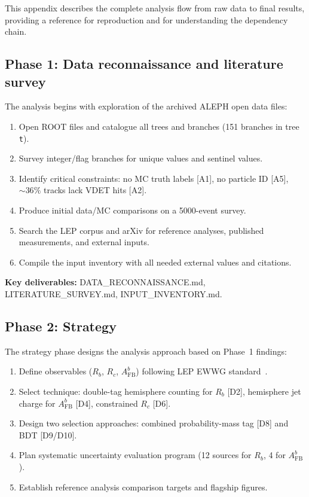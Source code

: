 \documentclass[11pt,a4paper]{article}
\begin{document}
This appendix describes the complete analysis flow from raw data to final results,
providing a reference for reproduction and for understanding the dependency chain.

\subsection{Phase 1: Data reconnaissance and literature survey}

The analysis begins with exploration of the archived ALEPH open data files:
\begin{enumerate}
\item Open ROOT files and catalogue all trees and branches (151 branches in tree \texttt{t}).
\item Survey integer/flag branches for unique values and sentinel values.
\item Identify critical constraints: no MC truth labels [A1], no particle ID [A5],
$\sim 36\%$ tracks lack VDET hits [A2].
\item Produce initial data/MC comparisons on a 5000-event survey.
\item Search the LEP corpus and arXiv for reference analyses, published measurements,
and external inputs.
\item Compile the input inventory with all needed external values and citations.
\end{enumerate}

\textbf{Key deliverables:} DATA\_RECONNAISSANCE.md, LITERATURE\_SURVEY.md, INPUT\_INVENTORY.md.

\subsection{Phase 2: Strategy}

The strategy phase designs the analysis approach based on Phase~1 findings:
\begin{enumerate}
\item Define observables ($R_b$, $R_c$, $A_\mathrm{FB}^b$) following LEP EWWG
standard~\cite{LEP:EWWG:2005}.
\item Select technique: double-tag hemisphere counting for $R_b$ [D2], hemisphere jet
charge for $A_\mathrm{FB}^b$ [D4], constrained $R_c$ [D6].
\item Design two selection approaches: combined probability-mass tag [D8] and BDT [D9/D10].
\item Plan systematic uncertainty evaluation program (12 sources for $R_b$, 4 for $A_\mathrm{FB}^b$).
\item Establish reference analysis comparison targets and flagship figures.
\end{enumerate}
\end{document}
